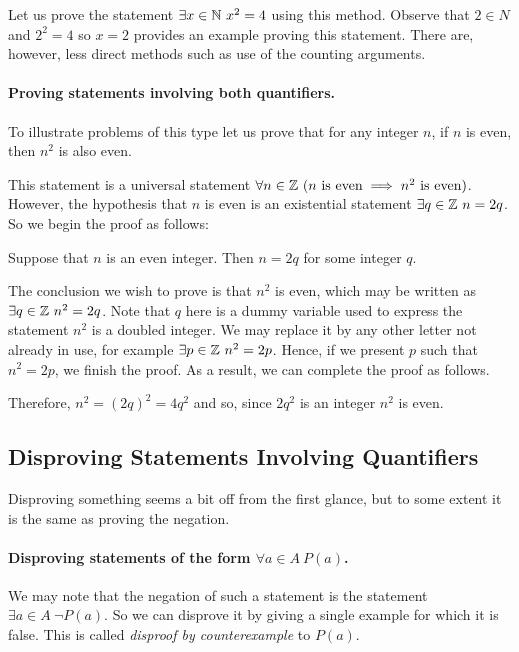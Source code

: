 Let us prove the statement $\exists x \in {\mathbb{N}} \ x^2 = 4$ using this method.
Observe that $2 \in N$ and $2^2 = 4$ so $x = 2$ provides an example proving
this statement. There are, however, less direct methods such as use of the
counting arguments.

\paragraph{Proving statements involving both quantifiers.}
To illustrate problems of this type let us prove that for any integer $n$, if
$n$ is even, then $n^2$ is also even.

This statement is a universal statement $\forall n \in {\mathbb{Z}} \ (n \text{ is even}
\implies n^2 \text{ is even})$. However, the hypothesis that $n$ is even is an
existential statement $\exists q \in {\mathbb{Z}} \ n = 2q$. So we begin the proof as
follows:
\begin{center}
    Suppose that $n$ is an even integer. Then $n = 2q$ for some integer $q$.
\end{center}
The conclusion we wish to prove is that $n^2$ is even, which may be written as
$\exists q \in {\mathbb{Z}} \ n^2 = 2q$. Note that $q$ here is a dummy variable used to
express the statement $n^2$ is a doubled integer. We may replace it by any
other letter not already in use, for example $\exists p \in {\mathbb{Z}} \ n^2 = 2p$.
Hence, if we present $p$ such that $n^2 = 2p$, we finish the proof. As a result,
we can complete the proof as follows.
\begin{center}
    Therefore, $n^2 = (2q)^2 = 4q^2$ and so, since $2q^2$ is an integer $n^2$ is
    even.
\end{center}

\subsection{Disproving Statements Involving Quantifiers}
Disproving something seems a bit off from the first glance, but to some extent
it is the same as proving the negation.

\paragraph{Disproving statements of the form $\forall a \in A \ P(a)$.}
We may note that the negation of such a statement is the statement $\exists a
\in A \ \lnot P(a)$. So we can disprove it by giving a single example for which
it is false. This is called \emph{disproof by counterexample} to $P(a)$.


